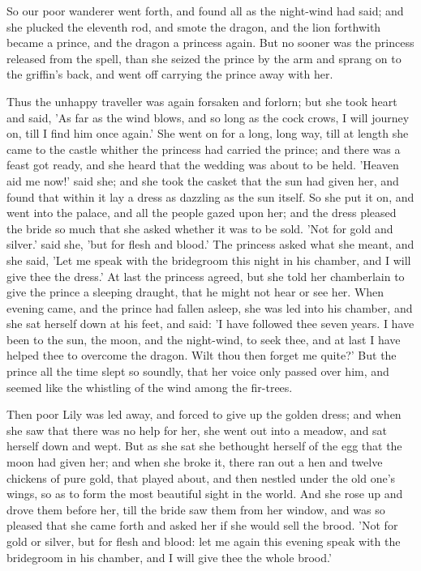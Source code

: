 \documentclass[12pt]{book}
\begin{document}
So our poor wanderer went forth, and found all as the night-wind had
said; and she plucked the eleventh rod, and smote the dragon, and the
lion forthwith became a prince, and the dragon a princess again. But
no sooner was the princess released from the spell, than she seized
the prince by the arm and sprang on to the griffin's back, and went
off carrying the prince away with her.

Thus the unhappy traveller was again forsaken and forlorn; but she
took heart and said, 'As far as the wind blows, and so long as the
cock crows, I will journey on, till I find him once again.' She went
on for a long, long way, till at length she came to the castle whither
the princess had carried the prince; and there was a feast got ready,
and she heard that the wedding was about to be held. 'Heaven aid me
now!' said she; and she took the casket that the sun had given her,
and found that within it lay a dress as dazzling as the sun itself. So
she put it on, and went into the palace, and all the people gazed upon
her; and the dress pleased the bride so much that she asked whether it
was to be sold. 'Not for gold and silver.' said she, 'but for flesh
and blood.' The princess asked what she meant, and she said, 'Let me
speak with the bridegroom this night in his chamber, and I will give
thee the dress.' At last the princess agreed, but she told her
chamberlain to give the prince a sleeping draught, that he might not
hear or see her. When evening came, and the prince had fallen asleep,
she was led into his chamber, and she sat herself down at his feet,
and said: 'I have followed thee seven years. I have been to the sun,
the moon, and the night-wind, to seek thee, and at last I have helped
thee to overcome the dragon. Wilt thou then forget me quite?' But the
prince all the time slept so soundly, that her voice only passed over
him, and seemed like the whistling of the wind among the fir-trees.

Then poor Lily was led away, and forced to give up the golden dress;
and when she saw that there was no help for her, she went out into a
meadow, and sat herself down and wept. But as she sat she bethought
herself of the egg that the moon had given her; and when she broke it,
there ran out a hen and twelve chickens of pure gold, that played
about, and then nestled under the old one's wings, so as to form the
most beautiful sight in the world. And she rose up and drove them
before her, till the bride saw them from her window, and was so
pleased that she came forth and asked her if she would sell the brood.
'Not for gold or silver, but for flesh and blood: let me again this
evening speak with the bridegroom in his chamber, and I will give thee
the whole brood.'
\end{document}
